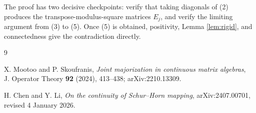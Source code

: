 \documentclass[11pt]{article}
\begin{document}
The proof has two decisive checkpoints: verify that taking diagonals of (2)
produces the transpose-modulus-square matrices $E_j$, and verify the limiting
argument from (3) to (5).  Once (5) is obtained, positivity, Lemma
\ref{lem:rigid}, and connectedness give the contradiction directly.

\begin{thebibliography}{9}

X. Mootoo and P. Skoufranis,
\emph{Joint majorization in continuous matrix algebras},
J. Operator Theory \textbf{92} (2024), 413--438;
arXiv:2210.13309.

H. Chen and Y. Li,
\emph{On the continuity of Schur--Horn mapping},
arXiv:2407.00701, revised 4 January 2026.

\end{thebibliography}
\end{document}

